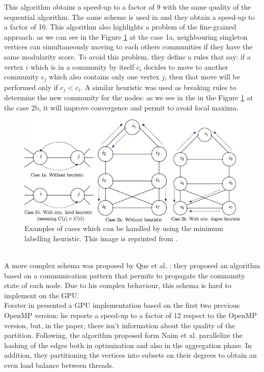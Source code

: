 This algorithm obtains a speed-up to a factor of 9 with the same quality of the sequential algorithm. The same scheme is used in \cite{lu2015parallel} and they obtain a speed-up to a factor of 16.
This algorithm also highlights a problem of the fine-grained approach: as we can see in the Figure \ref{fig:swap} at the case 1a, neighbouring singleton vertices can simultaneously moving to each others communities if they have the same modularity score. To avoid this problem, they define a rules that say: if a vertex $i$ which is in a community by itself $c_i$ decides to move to another community $c_j$  which also contains only one vertex $j$, then that move will be performed only if $c_j < c_i$. A similar heuristic was used as breaking rules to determine the new community for the nodes: as we see in the in the Figure \ref{fig:swap} at the case 2b, it will improve convergence and permit to avoid local maxima.
\begin{figure}
	\centering
	\includegraphics[width=1\linewidth]{0-resources/swap.jpg}
	\caption{ Examples of cases which can be handled by using the minimum labelling heuristic. This image is reprinted from \cite{lu2015parallel}.}
	\label{fig:swap}
\end{figure}\\
A more complex schema was proposed by Que et al. \cite{que2015scalable}: they proposed an algorithm based on a communication pattern that permits to propagate the community state of each node. 
Due to his complex behaviour, this schema is hard to implement on the GPU. \\
Forster in \cite{forster2016louvain} presented a GPU implementation based on the first two previous OpenMP version: he reports a speed-up to a factor of 12 respect to the OpenMP version, but, in the paper, there isn't information about the quality of the partition. Following, the algorithm proposed form Naim et al. \cite{naim2017community} parallelize the hashing of the edges both in optimization and also in the aggregation phase. In addition, they partitioning the vertices into subsets on their degrees to obtain an even load balance between threads.
